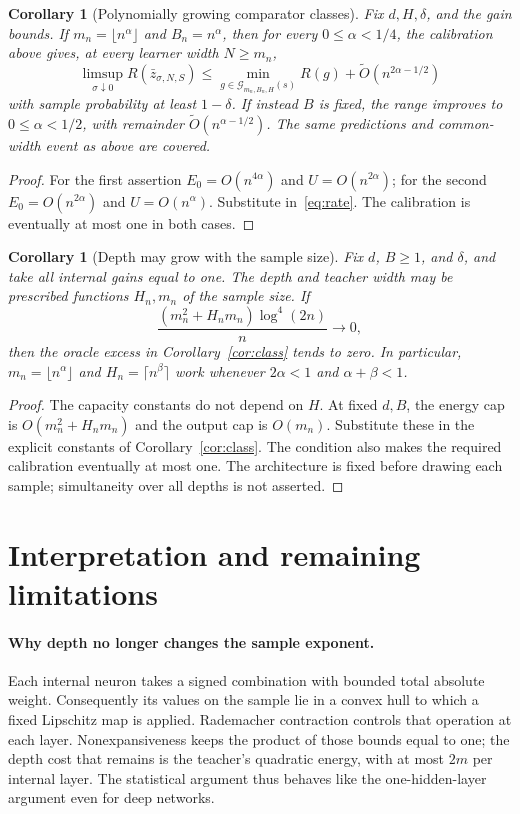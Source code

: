 \documentclass[11pt]{article}
\newtheorem{corollary}[theorem]{Corollary}
\theoremstyle{definition}\newtheorem{definition}[theorem]{Definition}
\theoremstyle{remark}\newtheorem{remark}[theorem]{Remark}
\begin{document}
\begin{corollary}[Polynomially growing comparator classes]
\label{cor:growing}
Fix $d,H,\delta$, and the gain bounds. If $m_n=\lfloor n^\alpha\rfloor$ and $B_n=n^\alpha$, then for every $0\leq\alpha<1/4$, the calibration above gives, at every learner width $N\geq m_n$,
\[
 \limsup_{\sigma\downarrow0}R(\bar z_{\sigma,N,S})
 \leq \min_{g\in\mathcal G_{m_n,B_n,H}(s)}R(g)
            +\widetilde O(n^{2\alpha-1/2})
\]
with sample probability at least $1-\delta$. If instead $B$ is fixed, the range improves to $0\leq\alpha<1/2$, with remainder $\widetilde O(n^{\alpha-1/2})$. The same predictions and common-width event as above are covered.
\end{corollary}
\begin{proof}
For the first assertion $E_0=O(n^{4\alpha})$ and $U=O(n^{2\alpha})$; for the second $E_0=O(n^{2\alpha})$ and $U=O(n^\alpha)$. Substitute in~\eqref{eq:rate}. The calibration is eventually at most one in both cases.
\end{proof}

\begin{corollary}[Depth may grow with the sample size]
\label{cor:growing-depth}
Fix $d$, $B\geq1$, and $\delta$, and take all internal gains equal to one. The depth and teacher width may be prescribed functions $H_n,m_n$ of the sample size. If
\[
 \frac{(m_n^2+H_nm_n)\log^4(2n)}n\longrightarrow0,
\]
then the oracle excess in Corollary~\ref{cor:class} tends to zero. In particular, $m_n=\lfloor n^\alpha\rfloor$ and $H_n=\lceil n^\beta\rceil$ work whenever $2\alpha<1$ and $\alpha+\beta<1$.
\end{corollary}
\begin{proof}
The capacity constants do not depend on $H$. At fixed $d,B$, the energy cap is $O(m_n^2+H_nm_n)$ and the output cap is $O(m_n)$. Substitute these in the explicit constants of Corollary~\ref{cor:class}. The condition also makes the required calibration eventually at most one. The architecture is fixed before drawing each sample; simultaneity over all depths is not asserted.
\end{proof}




\section{Interpretation and remaining limitations}

\paragraph{Why depth no longer changes the sample exponent.}
Each internal neuron takes a signed combination with bounded total absolute weight. Consequently its values on the sample lie in a convex hull to which a fixed Lipschitz map is applied. Rademacher contraction controls that operation at each layer. Nonexpansiveness keeps the product of those bounds equal to one; the depth cost that remains is the teacher's quadratic energy, with at most $2m$ per internal layer. The statistical argument thus behaves like the one-hidden-layer argument even for deep networks.
\end{document}
